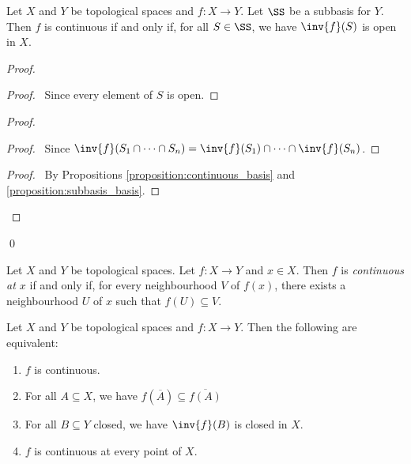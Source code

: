 \begin{proposition}
    \label{proposition:continuous_subbasis}
    Let $X$ and $Y$ be topological spaces and $f : X \rightarrow Y$. Let $\SS$ be a subbasis for $Y$. Then $f$
    is continuous if and only if, for all $S \in \SS$, we have $\inv{f}(S)$ is open in $X$.
\end{proposition}

\begin{proof}
    \pf
    \begin{proof}
        \pf\ Since every element of $S$ is open.
    \end{proof}
    \begin{proof}
        \begin{proof}
            \pf\ Since $\inv{f}(S_1 \cap \cdots \cap S_n) = \inv{f}(S_1) \cap \cdots \cap \inv{f}(S_n)$.
        \end{proof}
        \qedstep
        \begin{proof}
            \pf\ By Propositions \ref{proposition:continuous_basis} and \ref{proposition:subbasis_basis}.
        \end{proof}
    \end{proof}
    \qed
\end{proof}

\begin{definition}
    Let $X$ and $Y$ be topological spaces. Let $f : X \rightarrow Y$ and $x \in X$. Then $f$ is
    \emph{continuous at $x$} if and only if, for every neighbourhood $V$ of $f(x)$, there exists a
    neighbourhood $U$ of $x$ such that $f(U) \subseteq V$.
\end{definition}

\begin{theorem}
    \label{theorem:continuous}
    Let $X$ and $Y$ be topological spaces and $f : X \rightarrow Y$. Then the following are equivalent:
    \begin{enumerate}
        \item $f$ is continuous.
        \item For all $A \subseteq X$, we have $f(\overline{A}) \subseteq \overline{f(A)}$
        \item For all $B \subseteq Y$ closed, we have $\inv{f}(B)$ is closed in $X$.
        \item $f$ is continuous at every point of $X$.
    \end{enumerate}
\end{theorem}

